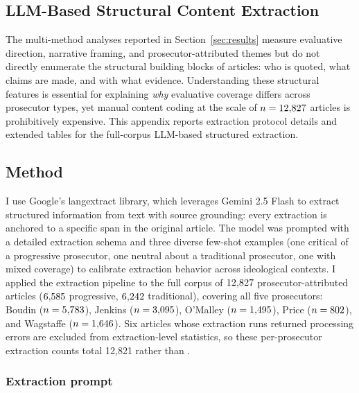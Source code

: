 \documentclass[12pt, letterpaper]{article}
\begin{document}
\begin{appendices}

\section{LLM-Based Structural Content Extraction}
\label{app:extraction}

The multi-method analyses reported in Section~\ref{sec:results} measure evaluative direction, narrative framing, and prosecutor-attributed themes but do not directly enumerate the structural building blocks of articles: who is quoted, what claims are made, and with what evidence. Understanding these structural features is essential for explaining \emph{why} evaluative coverage differs across prosecutor types, yet manual content coding at the scale of $n=12{,}827$ articles is prohibitively expensive. This appendix reports extraction protocol details and extended tables for the full-corpus LLM-based structured extraction.

\subsection*{Method}

I use Google's langextract library, which leverages Gemini 2.5 Flash to extract structured information from text with source grounding: every extraction is anchored to a specific span in the original article. The model was prompted with a detailed extraction schema and three diverse few-shot examples (one critical of a progressive prosecutor, one neutral about a traditional prosecutor, one with mixed coverage) to calibrate extraction behavior across ideological contexts. I applied the extraction pipeline to the full corpus of $12{,}827$ prosecutor-attributed articles ($6{,}585$ progressive, $6{,}242$ traditional), covering all five prosecutors: Boudin ($n=5{,}783$), Jenkins ($n=3{,}095$), O'Malley ($n=1{,}495$), Price ($n=802$), and Wagstaffe ($n=1{,}646$). Six articles whose extraction runs returned processing errors are excluded from extraction-level statistics, so these per-prosecutor extraction counts total 12{,}821 rather than \NAttributedTotal.

\subsubsection*{Extraction prompt}


\end{appendices}
\end{document}
